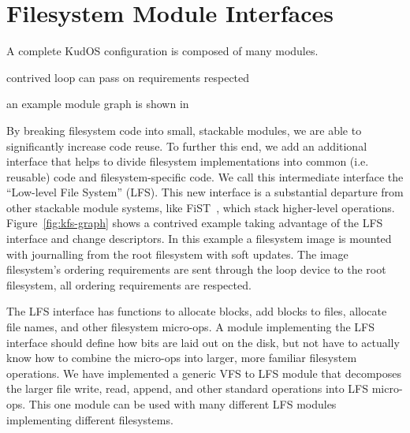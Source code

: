 \preparagraphspacing{}
\section*{Filesystem Module Interfaces}
\label{sec:interfaces}

A complete KudOS configuration is composed of many modules. 

contrived
loop can pass on
requirements respected

an example module
graph is shown in 

By breaking filesystem code into
small, stackable modules, we are able to significantly increase code reuse. To
further this end, we add an additional interface that helps to divide filesystem
implementations into common (i.e. reusable) code and filesystem-specific code.
We call this intermediate interface the ``Low-level File System'' (LFS). This
new interface is a substantial departure from other stackable module systems,
like FiST~\cite{zadok00fist}, which stack higher-level operations.
%
Figure~\ref{fig:kfs-graph} shows a contrived example taking advantage
of the LFS interface and change descriptors. In this example a
filesystem image is mounted with journalling from the root filesystem
with soft updates. The image filesystem's ordering requirements are
sent through the loop device to the root filesystem, all ordering
requirements are respected.

The LFS interface has functions to allocate blocks, add blocks to
files, allocate file names, and other filesystem micro-ops. A module
implementing the LFS interface should define how bits are laid out on
the disk, but not have to actually know how to combine the micro-ops
into larger, more familiar filesystem operations. We have implemented
a generic VFS to LFS module that decomposes the larger file write,
read, append, and other standard operations into LFS micro-ops. This
one module can be used with many different LFS modules implementing
different filesystems.

